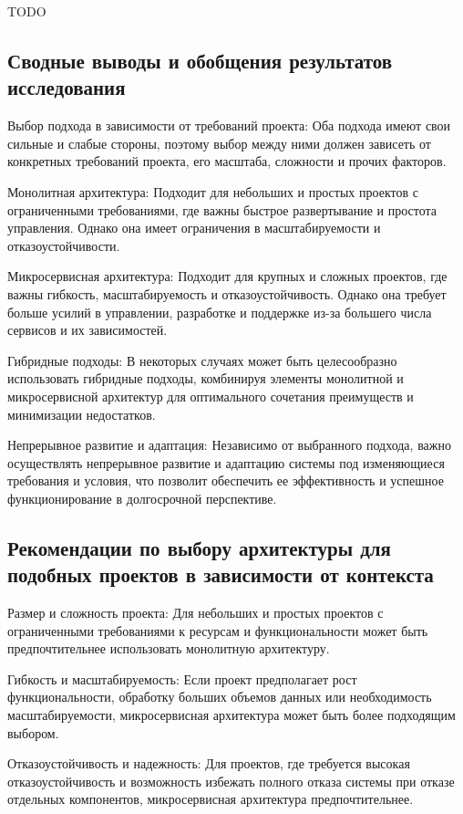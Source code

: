    TODO

\subsection*{Сводные выводы и обобщения результатов исследования}
    Выбор подхода в зависимости от требований проекта: Оба подхода имеют свои сильные и слабые стороны, поэтому выбор между ними должен зависеть от конкретных требований проекта, его масштаба, сложности и прочих факторов.

    Монолитная архитектура: Подходит для небольших и простых проектов с ограниченными требованиями, где важны быстрое развертывание и простота управления. Однако она имеет ограничения в масштабируемости и отказоустойчивости.

    Микросервисная архитектура: Подходит для крупных и сложных проектов, где важны гибкость, масштабируемость и отказоустойчивость. Однако она требует больше усилий в управлении, разработке и поддержке из-за большего числа сервисов и их зависимостей.

    Гибридные подходы: В некоторых случаях может быть целесообразно использовать гибридные подходы, комбинируя элементы монолитной и микросервисной архитектур для оптимального сочетания преимуществ и минимизации недостатков.

    Непрерывное развитие и адаптация: Независимо от выбранного подхода, важно осуществлять непрерывное развитие и адаптацию системы под изменяющиеся требования и условия, что позволит обеспечить ее эффективность и успешное функционирование в долгосрочной перспективе.



\subsection*{Рекомендации по выбору архитектуры для подобных проектов в зависимости от контекста}

    Размер и сложность проекта: Для небольших и простых проектов с ограниченными требованиями к ресурсам и функциональности может быть предпочтительнее использовать монолитную архитектуру.

    Гибкость и масштабируемость: Если проект предполагает рост функциональности, обработку больших объемов данных или необходимость масштабируемости, микросервисная архитектура может быть более подходящим выбором.

    Отказоустойчивость и надежность: Для проектов, где требуется высокая отказоустойчивость и возможность избежать полного отказа системы при отказе отдельных компонентов, микросервисная архитектура предпочтительнее.


